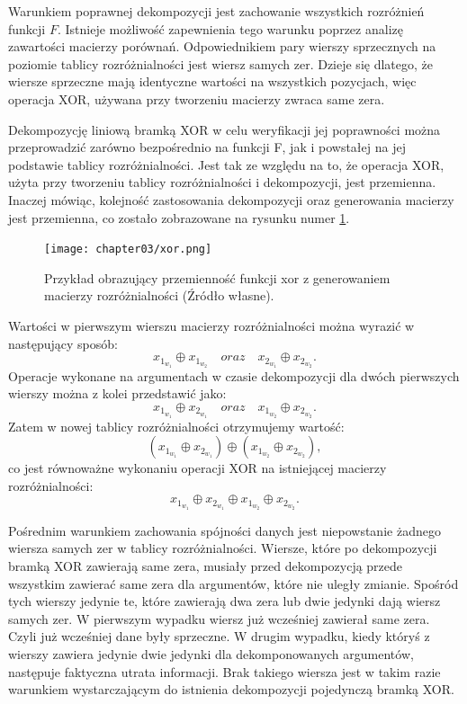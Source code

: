 Warunkiem poprawnej dekompozycji jest zachowanie wszystkich rozróżnień funkcji $F$.
Istnieje możliwość zapewnienia tego warunku poprzez analizę zawartości macierzy porównań.
Odpowiednikiem pary wierszy sprzecznych na poziomie tablicy rozróżnialności jest wiersz samych zer.
Dzieje się dlatego,
że wiersze sprzeczne mają identyczne wartości na wszystkich pozycjach,
więc operacja XOR,
używana przy tworzeniu macierzy zwraca same zera.

Dekompozycję liniową bramką XOR w celu weryfikacji jej poprawności można przeprowadzić zarówno bezpośrednio na funkcji F,
jak i powstałej na jej podstawie tablicy rozróżnialności.
Jest tak ze względu na to,
że operacja XOR,
użyta przy tworzeniu tablicy rozróżnialności i dekompozycji,
jest przemienna.
Inaczej mówiąc,
kolejność zastosowania dekompozycji oraz generowania macierzy jest przemienna,
co zostało zobrazowane na rysunku numer \ref{fig:xor}.

\begin{figure}[H]
\centering
\texttt{[image: chapter03/xor.png]}
\caption{Przykład obrazujący przemienność funkcji xor z generowaniem macierzy rozróżnialności (Źródło własne).}
\label{fig:xor}
\end{figure}

Wartości w pierwszym wierszu macierzy rozróżnialności można wyrazić w następujący sposób:
\begin{equation}
x_{1_{w_1}} \oplus x_{1_{w_2}} \quad oraz \quad x_{2_{w_1}} \oplus x_{2_{w_2}}.
\end{equation}
Operacje wykonane na argumentach w czasie dekompozycji dla dwóch pierwszych wierszy można z kolei przedstawić jako:
\begin{equation}
x_{1_{w_1}} \oplus x_{2_{w_1}} \quad oraz \quad x_{1_{w_2}} \oplus x_{2_{w_2}}.
\end{equation}
Zatem w nowej tablicy rozróżnialności otrzymujemy wartość:
\begin{equation}
(x_{1_{w_1}} \oplus x_{2_{w_1}}) \oplus (x_{1_{w_2}} \oplus x_{2_{w_2}}),
\end{equation}
 co jest równoważne wykonaniu operacji XOR na istniejącej macierzy rozróżnialności:
\begin{equation}
x_{1_{w_1}} \oplus x_{2_{w_1}} \oplus x_{1_{w_2}} \oplus x_{2_{w_2}}.
\end{equation}

Pośrednim warunkiem zachowania spójności danych jest niepowstanie żadnego wiersza samych zer w tablicy rozróżnialności.
Wiersze,
które po dekompozycji bramką XOR zawierają same zera,
musiały przed dekompozycją przede wszystkim zawierać same zera dla argumentów,
które nie uległy zmianie.
Spośród tych wierszy jedynie te,
które zawierają dwa zera lub dwie jedynki dają wiersz samych zer.
W pierwszym wypadku wiersz już wcześniej zawierał same zera.
Czyli już wcześniej dane były sprzeczne.
W drugim wypadku,
kiedy któryś z wierszy zawiera jedynie dwie jedynki dla dekomponowanych argumentów,
następuje faktyczna utrata informacji.
Brak takiego wiersza jest w takim razie warunkiem wystarczającym do istnienia dekompozycji pojedynczą bramką XOR.

